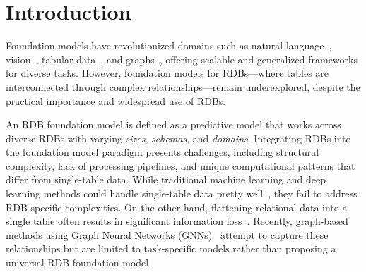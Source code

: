 \documentclass{article}
\theoremstyle{plain}
\theoremstyle{definition}
\theoremstyle{remark}
\begin{document}
\begin{abstract}
We introduce Griffin, the first foundation model attemptation designed specifically for Relational Databases (RDBs). Unlike previous smaller models focused on single RDB tasks, Griffin unifies the data encoder and task decoder to handle diverse tasks. Additionally, we enhance the architecture by incorporating a cross-attention module and a novel aggregator. Griffin utilizes pretraining on both single-table and RDB datasets, employing advanced encoders for categorical, numerical, and metadata features, along with innovative components such as cross-attention modules and enhanced message-passing neural networks (MPNNs) to capture the complexities of relational data. Evaluated on large-scale, heterogeneous, and temporal graphs extracted from RDBs across various domains (spanning over 150 million nodes), Griffin demonstrates superior or comparable performance to individually trained models, excels in low-data scenarios, and shows strong transferability with similarity and diversity in pretraining across new datasets and tasks, highlighting its potential as a universally applicable foundation model for RDBs. Code available at \href{https://github.com/yanxwb/Griffin}{\texttt{github.com/yanxwb/Griffin}}.
\end{abstract}

\section{Introduction}
Foundation models have revolutionized domains such as natural language~\citep{brown2020language,touvron2023llama}, vision~\citep{wang2023internimage,yuan2021florence}, tabular data~\citep{zhang2023towards,yang2024unitabe}, and graphs~\citep{liu2023one,tang2024graphgpt}, offering scalable and generalized frameworks for diverse tasks. However, foundation models for RDBs—where tables are interconnected through complex relationships—remain underexplored, despite the practical importance and widespread use of RDBs.

An RDB foundation model is defined as a predictive model that works across diverse RDBs with varying \textit{sizes}, \textit{schemas}, and \textit{domains}. Integrating RDBs into the foundation model paradigm presents challenges, including structural complexity, lack of processing pipelines, and unique computational patterns that differ from single-table data. While traditional machine learning and deep learning methods could handle single-table data pretty well~\citep{chen2016xgboost,ke2017lightgbm,prokhorenkova2018catboost,huang2020tabtransformer,arik2021tabnet,gorishniy2021revisiting}, they fail to address RDB-specific complexities. On the other hand, flattening relational data into a single table often results in significant information loss~\citep{cvitkovic2020supervised,chepurko2020arda}. Recently, graph-based methods using Graph Neural Networks (GNNs)~\citep{kanter2015deep, cvitkovic2020supervised, bai2021atj,zhang2023gfs, wang20244dbinfer, robinson2024relbench} attempt to capture these relationships but are limited to task-specific models rather than proposing a universal RDB foundation model.
\end{document}
